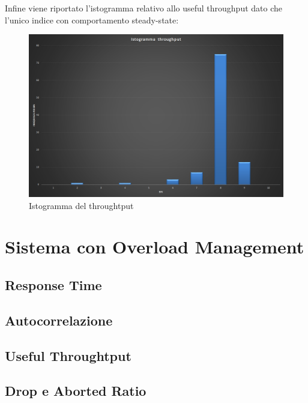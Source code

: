 Infine viene riportato l’istogramma relativo allo useful throughput dato che l’unico
indice con comportamento steady-state:

\begin{figure}[H]
 \centering
 \includegraphics[scale=0.45]{img/istogramma.png}
 \caption[Istogramma del throughtput]{Istogramma del throughtput}
 \label{fig:Istogramma del throughtput}
\end{figure}




\section{Sistema con Overload Management}

\subsection{Response Time}

\subsection{Autocorrelazione}

\subsection{Useful Throughtput}

\subsection{Drop e Aborted Ratio}